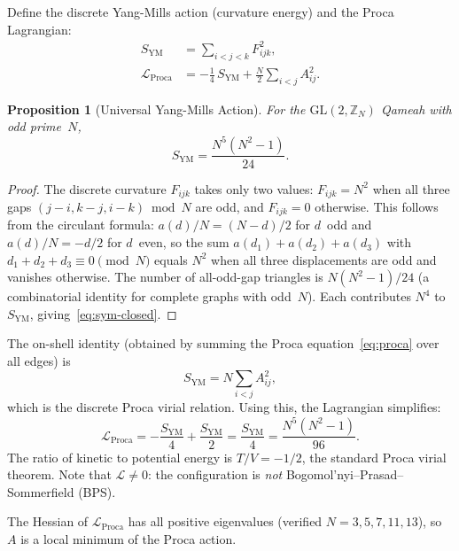 \documentclass[aip,jmp,reprint,superscriptaddress,floatfix,nofootinbib]{revtex4-2}
\newtheorem{proposition}[theorem]{Proposition}
\theoremstyle{definition}
\theoremstyle{remark}
\newcommand{\ZN}{\mathbb{Z}_N}
\newcommand{\GL}{\mathrm{GL}}
\begin{document}
Define the discrete Yang-Mills action (curvature energy) and the
Proca Lagrangian:
\begin{align}
S_{\mathrm{YM}} &= \sum_{i<j<k} F_{ijk}^2, \label{eq:SYM}\\
\mathcal{L}_{\mathrm{Proca}} &= -\frac{1}{4}\, S_{\mathrm{YM}}
  + \frac{N}{2}\sum_{i<j} A_{ij}^2. \label{eq:lagrangian}
\end{align}

\begin{proposition}[Universal Yang-Mills Action]\label{prop:sym}
For the $\GL(2,\ZN)$ Qameah with odd prime~$N$,
\begin{equation}\label{eq:sym-closed}
S_{\mathrm{YM}} = \frac{N^5(N^2-1)}{24}.
\end{equation}
\end{proposition}

\begin{proof}
The discrete curvature $F_{ijk}$ takes only two values: $F_{ijk} =
N^2$ when all three gaps $(j{-}i, k{-}j, i{-}k) \bmod N$ are odd,
and $F_{ijk} = 0$ otherwise.  This follows from the circulant
formula: $a(d)/N = (N{-}d)/2$ for $d$~odd and $a(d)/N = -d/2$ for
$d$~even, so the sum $a(d_1) + a(d_2) + a(d_3)$ with
$d_1 + d_2 + d_3 \equiv 0 \pmod{N}$ equals $N^2$ when all three
displacements are odd and vanishes otherwise.  The number of
all-odd-gap triangles is $N(N^2{-}1)/24$
(a combinatorial identity for complete graphs with odd~$N$).
Each contributes $N^4$ to $S_{\mathrm{YM}}$, giving~\eqref{eq:sym-closed}.
\end{proof}

The on-shell identity (obtained by summing the Proca
equation~\eqref{eq:proca} over all edges) is
\begin{equation}\label{eq:virial}
S_{\mathrm{YM}} = N \sum_{i<j} A_{ij}^2,
\end{equation}
which is the discrete Proca virial relation.  Using this, the
Lagrangian simplifies:
\begin{equation}\label{eq:lagrangian-onshell}
\mathcal{L}_{\mathrm{Proca}}
  = -\frac{S_{\mathrm{YM}}}{4} + \frac{S_{\mathrm{YM}}}{2}
  = \frac{S_{\mathrm{YM}}}{4}
  = \frac{N^5(N^2-1)}{96}.
\end{equation}
The ratio of kinetic to potential energy is
$T/V = -1/2$, the standard Proca virial theorem.  Note that
$\mathcal{L} \ne 0$: the configuration is \emph{not}
Bogomol'nyi--Prasad--Sommerfield (BPS).

The Hessian of $\mathcal{L}_{\mathrm{Proca}}$ has all positive
eigenvalues (verified $N = 3, 5, 7, 11, 13$), so $A$ is a local
minimum of the Proca action.
\end{document}
